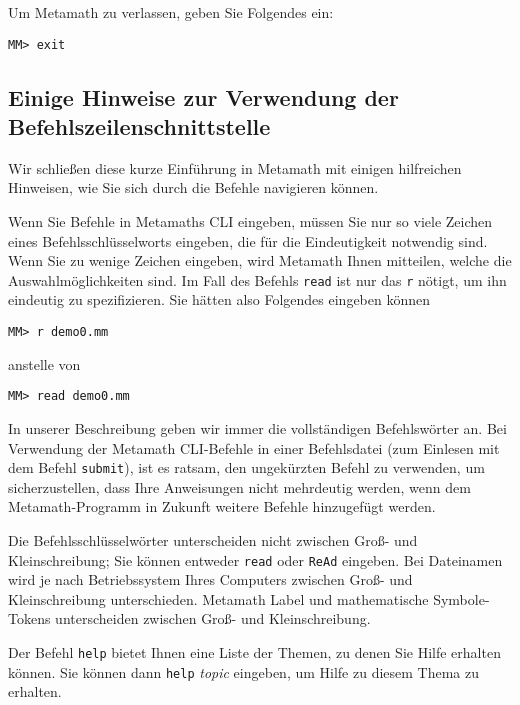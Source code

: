Um Metamath zu verlassen, geben Sie Folgendes ein:
\begin{verbatim}
MM> exit
\end{verbatim}

\subsection{Einige Hinweise zur Verwendung der Befehlszeilenschnittstelle}

Wir schließen diese kurze Einführung in Metamath mit einigen hilfreichen Hinweisen, wie Sie sich durch die Befehle navigieren können.

Wenn Sie Befehle in Metamaths CLI eingeben, müssen Sie nur so viele Zei\-chen eines Befehlsschlüsselworts eingeben, die für die Eindeutigkeit notwendig sind.  Wenn Sie zu wenige Zeichen eingeben, wird Metamath Ihnen mitteilen, welche die Auswahlmöglichkeiten sind.  Im Fall des Befehls \texttt{read} ist nur das \texttt{r} nötigt, um ihn eindeutig zu spezifizieren. Sie hätten also Folgendes eingeben können

\begin{verbatim}
MM> r demo0.mm
\end{verbatim}

anstelle von

\begin{verbatim}
MM> read demo0.mm
\end{verbatim}

In unserer Beschreibung geben wir immer die vollständigen Befehlswörter an.  Bei Verwendung der Metamath CLI-Befehle in einer Befehlsdatei (zum Einlesen mit dem Befehl \texttt{submit}), ist es ratsam, den ungekürzten Befehl zu verwenden, um sicherzustellen, dass Ihre Anweisungen nicht mehrdeutig werden, wenn dem Metamath-Programm in Zukunft weitere Befehle hinzugefügt werden.

Die Befehlsschlüsselwörter unterscheiden nicht zwischen Groß- und Kleinschreibung; Sie können entweder \texttt{read} oder \texttt{ReAd} eingeben.  Bei Dateinamen wird je nach Betriebssystem Ihres Computers zwischen Groß- und Kleinschreibung unterschieden.
Metamath Label und mathematische Symbole-Tokens unterscheiden zwischen Groß- und Kleinschreibung.

Der Befehl \texttt{help} bietet Ihnen eine Liste der Themen, zu denen Sie Hilfe erhalten können.  Sie können dann \texttt{help} {\em topic} eingeben, um Hilfe zu diesem Thema zu erhalten.

